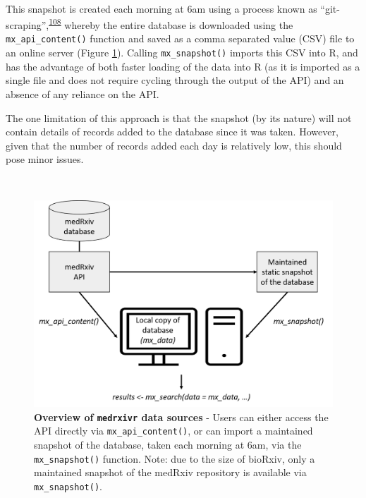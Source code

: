 \documentclass[a4paper, twoside]{templates/ociamthesis}
\begin{document}
~

This snapshot is created each morning at 6am using a process known as ``git-scraping'',\textsuperscript{\protect\hyperlink{ref-zotero-15031}{108}} whereby the entire database is downloaded using the \texttt{mx\_api\_content()} function and saved as a comma separated value (CSV) file to an online server (Figure \ref{fig:medrxivr-data-sources}). Calling \texttt{mx\_snapshot()} imports this CSV into R, and has the advantage of both faster loading of the data into R (as it is imported as a single file and does not require cycling through the output of the API) and an absence of any reliance on the API.

The one limitation of this approach is that the snapshot (by its nature) will not contain details of records added to the database since it was taken. However, given that the number of records added each day is relatively low, this should pose minor issues.

~





\begin{figure}[H]
\includegraphics[width=1\linewidth]{figures/sys-rev-tools/data_sources} \caption[Overview of \texttt{medrxivr} data sources]{\textbf{Overview of \texttt{medrxivr} data sources} - Users can either access the API directly via \texttt{mx\_api\_content()}, or can import a maintained snapshot of the database, taken each morning at 6am, via the \texttt{mx\_snapshot()} function. Note: due to the size of bioRxiv, only a maintained snapshot of the medRxiv repository is available via \texttt{mx\_snapshot()}.}\label{fig:medrxivr-data-sources}
\end{figure}
\end{document}
